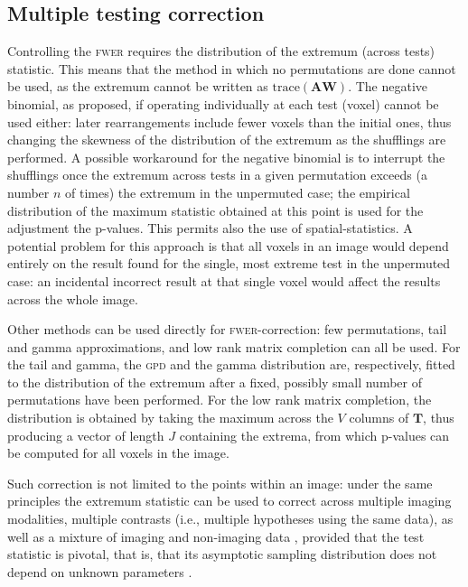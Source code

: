 \subsection{Multiple testing correction}

Controlling the \textsc{fwer} requires the distribution of the extremum (across tests) statistic. This means that the method in which no permutations are done cannot be used, as the extremum cannot be written as $\text{trace}(\mathbf{A}\mathbf{W})$. The negative binomial, as proposed, if operating individually at each test (voxel) cannot be used either: later rearrangements include fewer voxels than the initial ones, thus changing the skewness of the distribution of the extremum as the shufflings are performed. A possible workaround for the negative binomial is to interrupt the shufflings once the extremum across tests in a given permutation exceeds (a number $n$ of times) the extremum in the unpermuted case; the empirical distribution of the maximum statistic obtained at this point is used for the adjustment the p-values. This permits also the use of spatial-statistics. A potential problem for this approach is that all voxels in an image would depend entirely on the result found for the single, most extreme test in the unpermuted case: an incidental incorrect result at that single voxel would affect the results across the whole image.

Other methods can be used directly for \textsc{fwer}-correction: few permutations, tail and gamma approximations, and low rank matrix completion can all be used. For the tail and gamma, the \textsc{gpd} and the gamma distribution are, respectively, fitted to the distribution of the extremum after a fixed, possibly small number of permutations have been performed. For the low rank matrix completion, the distribution is obtained by taking the maximum across the $V$ columns of $\mathbf{T}$, thus producing a vector of length $J$ containing the extrema, from which p-values can be computed for all voxels in the image.

Such correction is not limited to the points within an image: under the same principles the extremum statistic can be used to correct across multiple imaging modalities, multiple contrasts (i.e., multiple hypotheses using the same data), as well as a mixture of imaging and non-imaging data \citep{Winkler2016_npc}, provided that the test statistic is pivotal, that is, that its asymptotic sampling distribution does not depend on unknown parameters \citep{Winkler2014}.

